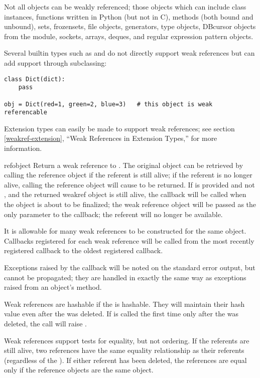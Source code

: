 Not all objects can be weakly referenced; those objects which can
include class instances, functions written in Python (but not in C),
methods (both bound and unbound), sets, frozensets, file objects,
generators, type objects, DBcursor objects from the  module,
sockets, arrays, deques, and regular expression pattern objects.

Several builtin types such as  and  do not
directly support weak references but can add support through subclassing:

\begin{verbatim}
class Dict(dict):
    pass

obj = Dict(red=1, green=2, blue=3)   # this object is weak referencable
\end{verbatim}

Extension types can easily be made to support weak references; see section
\ref{weakref-extension}, ``Weak References in Extension Types,'' for more
information.


\begin{classdesc}{ref}{object}
  Return a weak reference to .  The original object can be
  retrieved by calling the reference object if the referent is still
  alive; if the referent is no longer alive, calling the reference
  object will cause  to be returned.  If  is
  provided and not , and the returned weakref object is
  still alive, the callback will be called when the object is about to be
  finalized; the weak reference object will be passed as the only
  parameter to the callback; the referent will no longer be available.

  It is allowable for many weak references to be constructed for the
  same object.  Callbacks registered for each weak reference will be
  called from the most recently registered callback to the oldest
  registered callback.

  Exceptions raised by the callback will be noted on the standard
  error output, but cannot be propagated; they are handled in exactly
  the same way as exceptions raised from an object's
   method.

  Weak references are hashable if the  is hashable.  They
  will maintain their hash value even after the  was
  deleted.  If  is called the first time only after
  the  was deleted, the call will raise
  .

  Weak references support tests for equality, but not ordering.  If
  the referents are still alive, two references have the same
  equality relationship as their referents (regardless of the
  ).  If either referent has been deleted, the
  references are equal only if the reference objects are the same
  object.

\end{classdesc}

